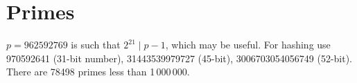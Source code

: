 \section{Primes}
	$p=962592769$ is such that $2^{21} \mid p-1$, which may be useful. For hashing
	use 970592641 (31-bit number), 31443539979727 (45-bit), 3006703054056749
	(52-bit). There are 78498 primes less than 1\,000\,000.







